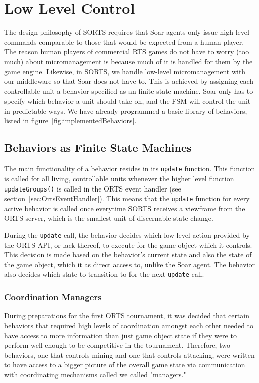 
\section{Low Level Control}
\label{sec:behaviors}

The design philosophy of SORTS requires that Soar agents only issue high
level commands comparable to those that would be expected from a human
player. The reason human players of commercial RTS games do not have to
worry (too much) about micromanagement is because much of it is handled
for them by the game engine. Likewise, in SORTS, we handle low-level
micromanagement with our middleware so that Soar does not have to. This
is achieved by assigning each controllable unit a behavior specified
as an finite state machine. Soar only has to specify which behavior a
unit should take on, and the FSM will control the unit in predictable
ways. We have already programmed a basic library of behaviors, listed in
figure~\ref{fig:implementedBehaviors}.

\subsection{Behaviors as Finite State Machines}

The main functionality of a behavior resides in its {\tt update}
function. This function is called for all living, controllable units
whenever the higher level function \verb|updateGroups()| is called in
the ORTS event handler (see section~\ref{sec:OrtsEventHandler}). This
means that the {\tt update} function for every active behavior is called
once everytime SORTS receives a viewframe from the ORTS server, which is
the smallest unit of discernable state change.

During the {\tt update} call, the behavior decides which low-level action
provided by the ORTS API, or lack thereof, to execute for the game
object which it controls. This decision is made based on the behavior's
current state and also the state of the game object, which it as direct
access to, unlike the Soar agent. The behavior also decides which state
to transition to for the next {\tt update} call.

\subsubsection{Coordination Managers}

During preparations for the first ORTS tournament, it was decided that
certain behaviors that required high levels of coordination amongst
each other needed to have access to more information than just game
object state if they were to perform well enough to be competitive in
the tournament. Therefore, two behaviors, one that controls mining and
one that controls attacking, were written to have access to a bigger
picture of the overall game state via communication with coordinating
mechanisms called we called "managers."

